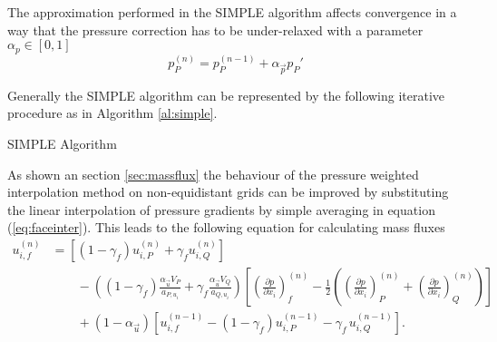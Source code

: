   The approximation performed in the SIMPLE algorithm affects convergence in a way that the pressure correction has to be under-relaxed with a parameter \(\alpha_p \in [0,1]\)
  \begin{equation}
    \label{eq:pressupdate}
    p_P^{(n)} = p_P^{(n-1)} + \alpha_{\vec{p}} p_P'
  \end{equation}

  Generally the SIMPLE algorithm can be represented by the following iterative procedure as in Algorithm \ref{al:simple}.
\begin{algorithm}
\label{al:simple}
\caption{SIMPLE Algorithm}
\begin{algorithmic}
  \EndIf
\EndWhile
\end{algorithmic}
\end{algorithm}

As shown an section \ref{sec:massflux} the behaviour of the pressure weighted interpolation method on non-equidistant grids can be improved by substituting the linear interpolation of pressure gradients by simple averaging in equation (\ref{eq:faceinter}). This leads to the following equation for calculating mass fluxes
  \begin{align}
    \label{eq:facecorr2}
    u_{i,f}^{(n)} 
    &=
    \left[\left(1 - \gamma_f\right) u_{i,P}^{(n)} + \gamma_f u_{i,Q}^{(n)} \right] \nonumber\\[1em]
    &\quad\quad - 
    \left(\left(1 - \gamma_f\right) \frac{\alpha_\vec{u} V_P}{a_{P,u_i}} + \gamma_f \frac{\alpha_\vec{u} V_Q}{a_{Q,u_i}}\right)
    \left[ 
    \left(\frac{\partial p}{\partial x_i}\right)_f^{(n)} 
    -  \frac{1}{2} \left( \left( \frac{\partial p}{\partial x_i} \right)_P^{(n)} 
    +  \left(\frac{\partial p}{\partial x_i}\right)_Q^{(n)} \right)
    \right] \nonumber \\[1em]
    &\quad\quad + \left(1 - \alpha_\vec{u}\right) \left[ u_{i,f}^{(n-1)} - \left(1 - \gamma_f\right) u_{i,P}^{(n-1)} - \gamma_f \, u_{i,Q}^{(n-1)} \right].
  \end{align}



